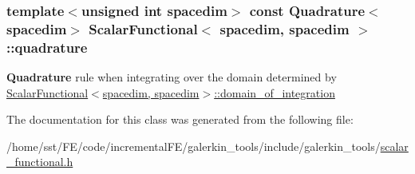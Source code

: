 \subsubsection[{\texorpdfstring{quadrature}{quadrature}}]{\setlength{\rightskip}{0pt plus 5cm}template$<$unsigned int spacedim$>$ const {\bf Quadrature}$<$spacedim$>$ {\bf Scalar\+Functional}$<$ spacedim, spacedim $>$\+::quadrature}\hypertarget{class_scalar_functional_3_01spacedim_00_01spacedim_01_4_ab83ee3ae077b211137824b006098382e}{}\label{class_scalar_functional_3_01spacedim_00_01spacedim_01_4_ab83ee3ae077b211137824b006098382e}
{\bf Quadrature} rule when integrating over the domain determined by \hyperlink{class_scalar_functional_3_01spacedim_00_01spacedim_01_4_aa192395f822a64f60df43bf9d36c2f3a}{Scalar\+Functional$<$spacedim, spacedim$>$\+::domain\+\_\+of\+\_\+integration} 

The documentation for this class was generated from the following file\+:\begin{DoxyCompactItemize}
\item 
/home/sst/\+F\+E/code/incremental\+F\+E/galerkin\+\_\+tools/include/galerkin\+\_\+tools/\hyperlink{scalar__functional_8h}{scalar\+\_\+functional.\+h}\end{DoxyCompactItemize}
